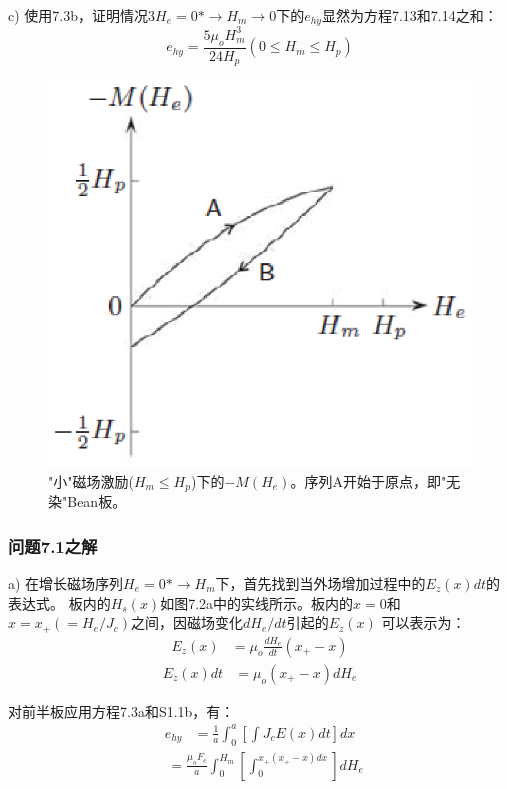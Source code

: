 c) 使用7.3b，证明情况3$H_e=0*\rightarrow H_m\rightarrow 0$下的$e_{hy}$显然为方程7.13和7.14之和：
\begin{equation}%
e_{hy}=\frac{5\mu_oH_{m}^{3}}{24H_p}      (0\leq H_m\leq H_p)
\end{equation}
\begin{figure}[htbp]
	\centering
	\includegraphics[scale=0.8]{chpt7/figs/fig7.10.eps}
	\caption{"小"磁场激励($H_m\le H_p$)下的$-M(H_e)$。序列A开始于原点，即"无染"Bean板。}
\end{figure}

\subsubsection{问题7.1之解}
a) 在增长磁场序列$H_e=0*\rightarrow H_m$下，首先找到当外场增加过程中的$E_z(x)dt$的表达式。
板内的$H_s(x)$如图7.2a中的实线所示。板内的$x=0$和$x=x_+(=H_e/J_c)$之间，因磁场变化$dH_e/dt$引起的$E_z(x)$
可以表示为：
\begin{align*}%
E_z(x)&=\mu_o\frac{dH_e}{dt}(x_+-x)\tag{S1.1a}
\end{align*}
\begin{align*}
E_z(x)dt&=\mu_o(x_+-x)dH_e \tag{S1.1b}
\end{align*}

对前半板应用方程7.3a和S1.1b，有：
\begin{align*}%
e_{hy}&=\frac{1}{a}\int_{0}^{a}\left[\int J_cE(x)dt\right]dx \tag{S1.2a}
\end{align*}
\begin{align*}
&=\frac{\mu_oF_c}{a}\int_{0}^{H_m}\left[\int_{0}^{x_+(x_+-x)dx}\right]dH_e \tag{S1.2b}
\end{align*}

